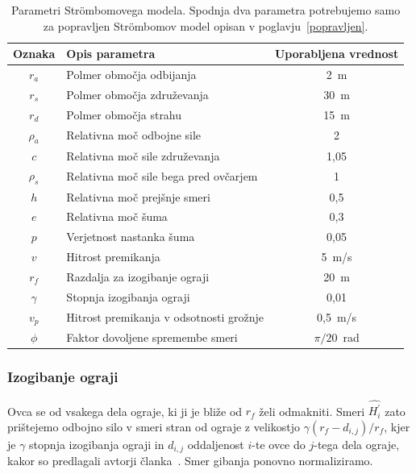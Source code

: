 \begin{table}[ht]
	\begin{center}
		\begin{tabular}{ c|l|c }
		\hline
		\textbf{Oznaka} & \textbf{Opis parametra} & \textbf{Uporabljena vrednost} \\ \hline  
		$r_a$ & Polmer območja odbijanja & 2~m \\ 
		$r_s$ & Polmer območja združevanja & 30~m \\ 
		$r_d$ & Polmer območja strahu & 15~m \\ 
		$\rho_a$ & Relativna moč odbojne sile & 2 \\ 
		$c$ & Relativna moč sile združevanja & 1,05 \\ 
		$\rho_s$ & Relativna moč sile bega pred ovčarjem & 1 \\ 
		$h$ & Relativna moč prejšnje smeri & 0,5 \\ 
		$e$ & Relativna moč šuma & 0,3 \\ 
		$p$ & Verjetnost nastanka šuma & 0,05 \\ 
		$v$ & Hitrost premikanja & 5~m/s \\ 
		$r_f$ & Razdalja za izogibanje ograji & 20~m \\ 
		$\gamma$ & Stopnja izogibanja ograji & 0,01 \\ \hline
		$v_p$ & Hitrost premikanja v odsotnosti grožnje & 0,5~m/s \\ 
		$\phi$ & Faktor dovoljene spremembe smeri & $\pi / 20$~rad \\ 
		\hline
		\end{tabular}
	\end{center}
\caption[Parametri Str{\"o}mbomovega modela gibanja ovc]{Parametri Str{\"o}mbomovega modela. Spodnja dva parametra potrebujemo samo za popravljen Str{\"o}mbomov model opisan v poglavju~\ref{popravljen}.}
\label{table:stroembom}
\end{table}

\subsubsection{Izogibanje ograji}\label{ograja}

Ovca se od vsakega dela ograje, ki ji je bliže od $r_f$ želi odmakniti. Smeri $\hat{H_i^\prime}$ zato prištejemo odbojno silo v smeri stran od ograje z velikostjo $\gamma (r_f - d_{i,j}) / r_f$, kjer je $\gamma$ stopnja izogibanja ograji in $d_{i,j}$ oddaljenost $i$-te ovce do $j$-tega dela ograje, kakor so predlagali avtorji članka~\cite{Demsar}. Smer gibanja ponovno normaliziramo.

